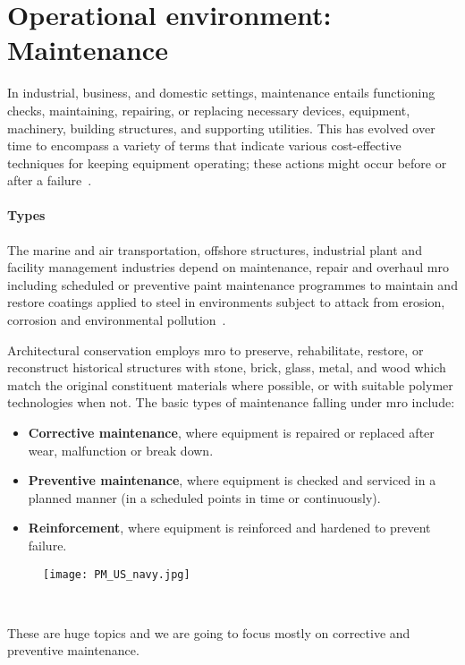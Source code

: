 \section{Operational environment: Maintenance}
In industrial, business, and domestic settings, maintenance entails functioning checks, maintaining, repairing,
or replacing necessary devices, equipment,  machinery, building structures, and supporting utilities.
This has evolved over time to encompass a variety of terms that indicate various cost-effective techniques for keeping equipment operating;
these actions might occur before or after a failure~\cite{Misc:maintenance_2016_efnms}. %

\paragraph{Types}
The marine and air transportation, offshore structures, industrial plant and facility management industries depend on maintenance,
repair and overhaul \acs{mro} including scheduled or preventive paint maintenance programmes to maintain and restore coatings applied
to steel in environments subject to attack from erosion, corrosion and environmental pollution~\cite{Report:iso_2018_paints}.

Architectural conservation employs \ac{mro} to preserve, rehabilitate, restore, or reconstruct historical structures with stone,
brick, glass, metal, and wood which match the original constituent materials where possible, or with suitable polymer technologies when not.
The basic types of maintenance falling under \acs{mro} include:
\begin{itemize}
    \item \textbf{Corrective maintenance}, where equipment is repaired or replaced after wear, malfunction or break down.
    \item \textbf{Preventive maintenance}, where equipment is checked and serviced in a planned manner (in a scheduled points in time or continuously).
    \item \textbf{Reinforcement}, where equipment is reinforced and hardened to prevent failure.
\end{itemize}
\begin{figure}[t]
    \centering
    \texttt{[image: PM\_US\_navy.jpg]}
    \caption{~\cite{file:boat_2016_uss}}
    \label{fig:boat_us_navy}
\end{figure}
These are huge topics and we are going to focus mostly on corrective and preventive maintenance.

